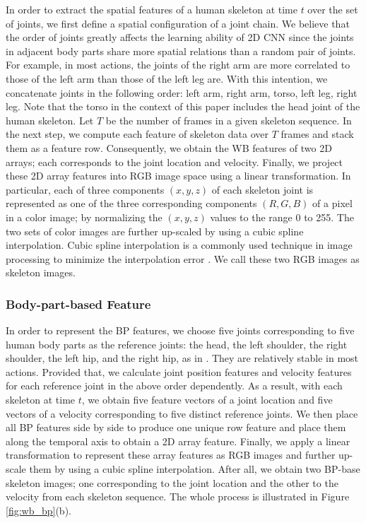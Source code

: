 \documentclass{bmvc2k}
\begin{document}
In order to extract the spatial features of a human skeleton at time $t$ over the set of joints, we first define a spatial configuration of a joint chain. We believe that the order of joints greatly affects the learning ability of 2D CNN since the joints in adjacent body parts share more spatial relations than a random pair of joints. For example, in most actions, the joints of the right arm are more correlated to those of the left arm than those of the left leg are. With this intention, we concatenate joints in the following order: left arm, right arm, torso, left leg, right leg. Note that the torso in the context of this paper includes the head joint of the human skeleton. Let $T$ be the number of frames in a given skeleton sequence. In the next step, we compute each feature of skeleton data over $T$ frames and stack them as a feature row. Consequently, we obtain the WB features of two 2D arrays; each corresponds to the joint location and velocity. Finally, we project these 2D array features into RGB image space using a linear transformation. In particular, each of three components $(x, y, z)$ of each skeleton joint is represented as one of the three corresponding components $(R, G, B)$ of a pixel in a color image; by normalizing the $(x, y, z)$ values to the range 0 to 255. The two sets of color images are further up-scaled by using a cubic spline interpolation. Cubic spline interpolation is a commonly used technique in image processing to minimize the interpolation error \cite{hou1978cubic}. We call these two RGB images as skeleton images.
\subsubsection{Body-part-based Feature} 
In order to represent the BP features, we choose five joints corresponding to five human body parts as the reference joints: the head, the left shoulder, the right shoulder, the left hip, and the right hip, as in \cite{ke2017skeletonnet}. They are relatively stable in most actions. Provided that, we calculate joint position features and velocity features for each reference joint in the above order dependently. 
As a result, with each skeleton at time $t$, we obtain five feature vectors of a joint location and five vectors of a velocity corresponding to five distinct reference joints. We then place all BP features side by side to produce one unique row feature and place them along the temporal axis to obtain a 2D array feature. Finally, we apply a linear transformation to represent these array features as RGB images and further up-scale them by using a cubic spline interpolation. After all, we obtain two BP-base skeleton images; one corresponding to the joint location and the other to the velocity from each skeleton sequence. The whole process is illustrated in Figure \ref{fig:wb_bp}(b).
\end{document}
